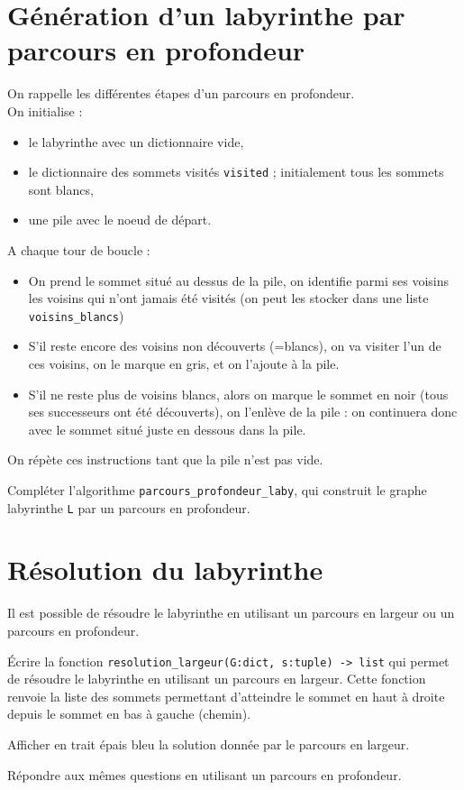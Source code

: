 \section{Génération d'un labyrinthe par parcours en profondeur}
On rappelle les différentes étapes d'un parcours en profondeur.\\
On initialise :
\begin{itemize}
\item
le labyrinthe avec un dictionnaire vide,
\item
le dictionnaire des sommets visités \texttt{visited} ; initialement tous les sommets sont blancs,
\item 
une pile avec  le noeud de départ.
\end{itemize}
 
A chaque tour de boucle :
\begin{itemize}
\item
On prend le sommet situé au dessus de la pile, on identifie parmi ses voisins les voisins qui n'ont jamais été visités (on peut les stocker dans une liste  \texttt{voisins\_blancs})
\item
S'il reste encore des voisins non découverts (=blancs), on va visiter l'un de ces voisins, on le marque en gris, et on l'ajoute à la pile.
\item S'il ne reste plus de voisins blancs, alors on marque le sommet en noir (tous ses successeurs ont été découverts), on l'enlève de la pile : on continuera donc avec le sommet situé juste en dessous dans la pile.
\end{itemize}

On répète ces instructions tant que la pile n'est pas vide.

\begin{question}
Compléter l'algorithme \texttt{parcours\_profondeur\_laby}, qui construit le graphe labyrinthe \texttt{L} par un parcours en profondeur.
\end{question}

\section{Résolution du labyrinthe}

Il est possible de résoudre le labyrinthe en utilisant un parcours en largeur ou un parcours en profondeur.

\begin{question} Écrire la fonction \texttt{resolution\_largeur(G:dict, s:tuple) -> list} qui permet de résoudre le labyrinthe en utilisant un parcours en largeur. Cette fonction renvoie la liste des sommets permettant d’atteindre le sommet en haut à droite depuis le sommet en bas à gauche (chemin).
\end{question}

\begin{question}
Afficher en trait épais bleu la solution donnée par le parcours en largeur.
\end{question}

\begin{question}
Répondre aux mêmes questions en utilisant un parcours en profondeur.
\end{question}

